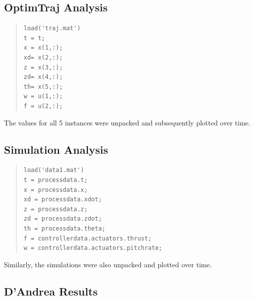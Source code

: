 \documentclass[12pt]{article}
\begin{document}
\subsection{OptimTraj Analysis}
\begin{quote}
\begin{lstlisting}
load('traj.mat')
t = t;
x = x(1,:);
xd= x(2,:);
z = x(3,:);
zd= x(4,:);
th= x(5,:);
w = u(1,:);
f = u(2,:);
\end{lstlisting}
\end{quote}
The values for all 5 instances were unpacked and subsequently plotted over time.
\subsection{Simulation Analysis}
\begin{quote}
\begin{lstlisting}
load('data1.mat')
t = processdata.t;
x = processdata.x;
xd = processdata.xdot;
z = processdata.z;
zd = processdata.zdot;
th = processdata.theta;
f = controllerdata.actuators.thrust;
w = controllerdata.actuators.pitchrate;
\end{lstlisting}
\end{quote}
Similarly, the simulations were also unpacked and plotted over time.



\subsection{D'Andrea Results}
\end{document}
